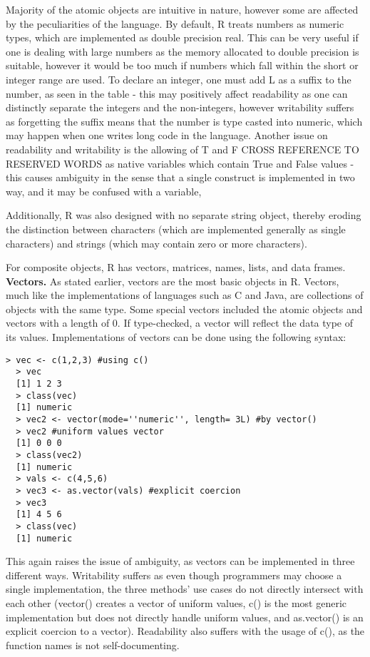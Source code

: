 \documentclass[12pt]{article}
\begin{document}
Majority of the atomic objects are intuitive in nature, however some are affected by the peculiarities of the language. By default, R treats numbers as numeric types, which are implemented as double precision real. This can be very useful if one is dealing with large numbers as the memory allocated to double precision is suitable, however it would be too much if numbers which fall within the short or integer range are used. To declare an integer, one must add L as a suffix to the number, as seen in the table - this may positively affect readability as one can distinctly separate the integers and the non-integers, however writability suffers as forgetting the suffix means that the number is type casted into numeric, which may happen when one writes long code in the language. Another issue on readability and writability is the allowing of T and F CROSS REFERENCE TO RESERVED WORDS as native variables which contain True and False values - this causes ambiguity in the sense that a single construct is implemented in two way, and it may be confused with a variable,


Additionally, R was also designed with no separate string object, thereby eroding the distinction between characters (which are implemented generally as single characters) and strings (which may contain zero or more characters).

For composite objects, R has vectors, matrices, names, lists, and data frames. \\

\textbf{Vectors.} As stated earlier, vectors are the most basic objects in R. Vectors, much like the implementations of languages such as C and Java, are collections of objects with the same type. Some special vectors included the atomic objects and vectors with a length of 0. If type-checked, a vector will reflect the data type of its values. Implementations of vectors can be done using the following syntax:

\begin{lstlisting}[frame=single]
  > vec <- c(1,2,3) #using c()
  > vec
  [1] 1 2 3
  > class(vec)
  [1] numeric
  > vec2 <- vector(mode=''numeric'', length= 3L) #by vector()
  > vec2 #uniform values vector
  [1] 0 0 0
  > class(vec2)
  [1] numeric
  > vals <- c(4,5,6)
  > vec3 <- as.vector(vals) #explicit coercion
  > vec3
  [1] 4 5 6
  > class(vec)
  [1] numeric
\end{lstlisting}

This again raises the issue of ambiguity, as vectors can be implemented in three different ways. Writability suffers as even though programmers may choose a single implementation, the three methods' use cases do not directly intersect with each other (vector() creates a vector of uniform values, c() is the most generic implementation but does not directly handle uniform values, and as.vector() is an explicit coercion to a vector). Readability also suffers with the usage of c(), as the function names is not self-documenting.\\
\end{document}
